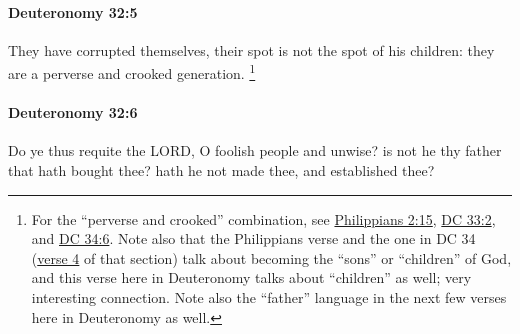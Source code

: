 		\paragraph{Deuteronomy 32:5} %
			\label{DEUTERONOMY-32-5}

			They have corrupted themselves, their spot is not the spot of his children: they are a perverse and crooked generation.%
				\footnote{%
					For the ``perverse and crooked'' combination, see \hyperref[PHILIPPIANS-2-15]{Philippians 2:15}, \hyperref[DC33-2]{DC 33:2}, and \hyperref[DC34-6]{DC 34:6}. Note also that the Philippians verse and the one in DC 34 (\hyperref[DC34-4]{verse 4} of that section) talk about becoming the ``sons'' or ``children'' of God, and this verse here in Deuteronomy talks about ``children'' as well; very interesting connection. Note also the ``father'' language in the next few verses here in Deuteronomy as well.
					}


		\paragraph{Deuteronomy 32:6} %
			\label{DEUTERONOMY-32-6}

			Do ye thus requite the LORD, O foolish people and unwise? is not he thy father that hath bought thee? hath he not made thee, and established thee?

